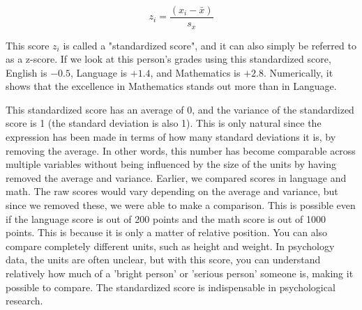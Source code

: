 \documentclass{ltjbook}
\begin{document}
\[ z_i = \frac{(x_i - \bar{x})}{s_x}\]

This score $z_i$ is called a "standardized score", and it can also simply be referred to as a z-score. If we look at this person's grades using this standardized score, English is $-0.5$, Language is $+1.4$, and Mathematics is $+2.8$. Numerically, it shows that the excellence in Mathematics stands out more than in Language.

This standardized score has an average of 0, and the variance of the standardized score is 1 (the standard deviation is also 1). This is only natural since the expression has been made in terms of how many standard deviations it is, by removing the average. In other words, this number has become comparable across multiple variables without being influenced by the size of the units by having removed the average and variance. Earlier, we compared scores in language and math. The raw scores would vary depending on the average and variance, but since we removed these, we were able to make a comparison. This is possible even if the language score is out of 200 points and the math score is out of 1000 points. This is because it is only a matter of relative position. You can also compare completely different units, such as height and weight. In psychology data, the units are often unclear, but with this score, you can understand relatively how much of a 'bright person' or 'serious person' someone is, making it possible to compare. The standardized score is indispensable in psychological research.
\end{document}
